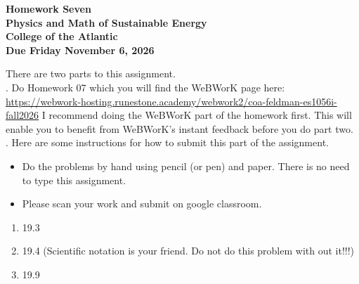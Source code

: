\documentclass[12pt]{article}
\begin{document}
\pagestyle{empty}
 
\begin{center}
{\LARGE {\bf Homework Seven}}\\
\bigskip
{\Large {\bf Physics and Math of Sustainable Energy}}\\
\bigskip
{\Large {\bf College of the Atlantic}}\\
\bigskip
{ {\bf Due Friday November 6, 2026}}\\ 
\end{center}
\medskip


\noindent There are two parts to this assignment.\\

.  Do Homework 07 which you
will find the WeBWorK page here:
\url{https://webwork-hosting.runestone.academy/webwork2/coa-feldman-es1056i-fall2026}
I recommend doing the WeBWorK part of the homework first.  This will
enable you to benefit from WeBWorK's instant feedback before you do part
two.\\ 


.  Here are some
instructions for how to submit this part of the assignment.
\begin{itemize}
\item Do the problems by hand using pencil (or pen) and paper.
  There is no need to type this assignment.

\item Please scan your work and submit on google classroom.\\
  
\end{itemize}


\begin{enumerate}
\setlength{\itemsep}{-1mm}
\item 19.3
\item 19.4 (Scientific notation is your friend. Do not do this problem with out it!!!)
\item 19.9 \\
\end{enumerate}
\end{document}
